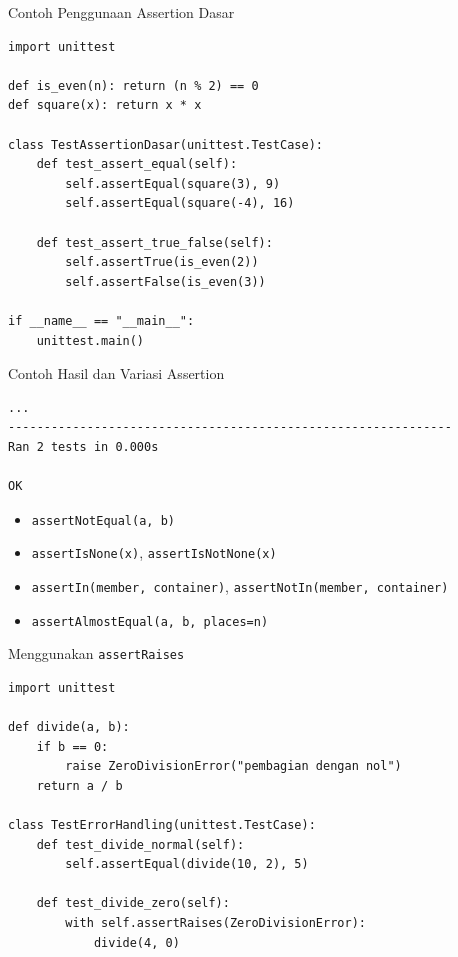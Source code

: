 \documentclass[aspectratio=169, table]{beamer}
\begin{document}
\begin{frame}[fragile]{Contoh Penggunaan Assertion Dasar}
\vspace*{20pt}
\begin{lstlisting}[style=PythonStyle]
import unittest

def is_even(n): return (n % 2) == 0
def square(x): return x * x

class TestAssertionDasar(unittest.TestCase):
    def test_assert_equal(self):
        self.assertEqual(square(3), 9)
        self.assertEqual(square(-4), 16)

    def test_assert_true_false(self):
        self.assertTrue(is_even(2))
        self.assertFalse(is_even(3))

if __name__ == "__main__":
    unittest.main()
\end{lstlisting}
\end{frame}

\begin{frame}[fragile]{Contoh Hasil dan Variasi Assertion}
\vspace*{20pt}
\begin{lstlisting}[language=bash]
...
--------------------------------------------------------------
Ran 2 tests in 0.000s

OK
\end{lstlisting}

\begin{itemize}
  \item \texttt{assertNotEqual(a, b)}
  \item \texttt{assertIsNone(x)}, \texttt{assertIsNotNone(x)}
  \item \texttt{assertIn(member, container)}, \texttt{assertNotIn(member, container)}
  \item \texttt{assertAlmostEqual(a, b, places=n)}
\end{itemize}
\end{frame}

\begin{frame}[fragile]{Menggunakan \texttt{assertRaises}}
\vspace*{20pt}
\begin{lstlisting}[style=PythonStyle]
import unittest

def divide(a, b):
    if b == 0:
        raise ZeroDivisionError("pembagian dengan nol")
    return a / b

class TestErrorHandling(unittest.TestCase):
    def test_divide_normal(self):
        self.assertEqual(divide(10, 2), 5)

    def test_divide_zero(self):
        with self.assertRaises(ZeroDivisionError):
            divide(4, 0)
\end{lstlisting}
\end{frame}
\end{document}
